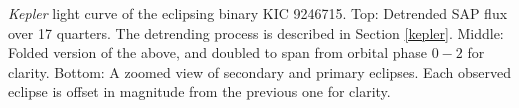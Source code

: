 \label{fig:keplerfig} \emph{Kepler} light curve of the eclipsing binary KIC 9246715. Top: Detrended SAP flux over 17 quarters. The detrending process is described in Section \ref{kepler}. Middle: Folded version of the above, and doubled to span from orbital phase $0-2$ for clarity. Bottom: A zoomed view of secondary and primary eclipses. Each observed eclipse is offset in magnitude from the previous one for clarity.
